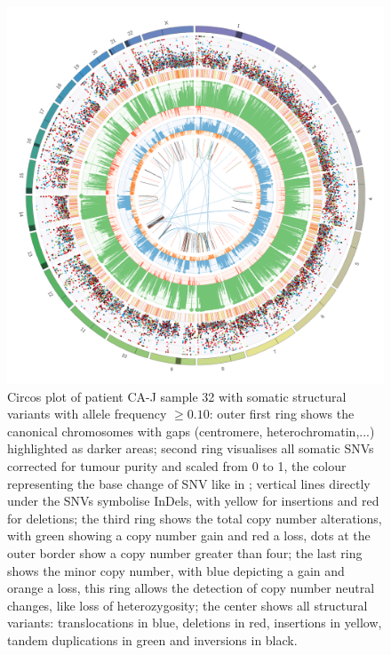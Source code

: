 \begin{figure}[ht]
\centering
\includegraphics[width=.99\linewidth]{Figures/CASCADE/CA80/CA80-32.circos.png}
\caption[Circos plot of patient CA-J sample 32]{Circos plot of patient CA-J sample 32 with somatic structural variants with allele frequency $\geq 0.10$: outer first ring shows the canonical chromosomes with gaps (centromere, heterochromatin,...) highlighted as darker areas; second ring visualises all somatic SNVs corrected for tumour purity and scaled from 0 to 1, the colour representing the base change of SNV like in \protect\textcite{Alexandrov2013}; vertical lines directly under the SNVs symbolise InDels, with yellow for insertions and red for deletions; the third ring shows the total copy number alterations, with green showing a copy number gain and red a loss, dots at the outer border show a copy number greater than four; the last ring shows the minor copy number, with blue depicting a gain and orange a loss, this ring allows the detection of copy number neutral changes, like loss of heterozygosity; the center shows all structural variants: translocations in blue, deletions in red, insertions in yellow, tandem duplications in green and inversions in black.} \label{fig:ca80.32circos}
\end{figure}

